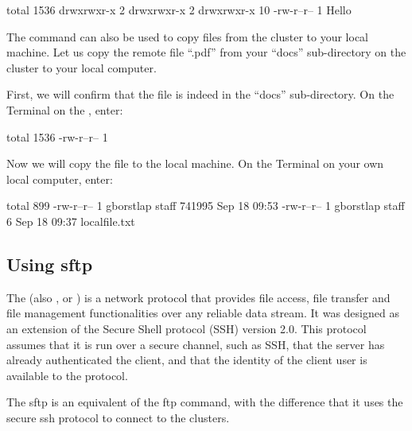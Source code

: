  \begin{prompt}
  total 1536
  drwxrwxr-x  2 %
  drwxrwxr-x  2 %
  drwxrwxr-x 10 %
  -rw-r--r--  1 %
  Hello
  \end{prompt}

  The  command can also be used to copy files from the cluster to your local machine.
  Let us copy the remote file ``\jobname.pdf'' from your ``docs''
  sub-directory on the cluster to your local computer.

  First, we will confirm that the file is indeed in the ``docs'' sub-directory.
  On the Terminal on the \hpc, enter:

  \begin{prompt}
  total 1536
  -rw-r--r-- 1 %
  \end{prompt}

  Now we will copy the file to the local machine. On the Terminal on your own local computer, enter:

  \begin{prompt}
  total  899
  -rw-r--r--   1 gborstlap  staff  741995 Sep 18 09:53 %
  -rw-r--r--   1 gborstlap  staff       6 Sep 18 09:37 localfile.txt
  \end{prompt}

  \subsection{Using sftp}

  The  (also , or ) is a network protocol that provides file access,
  file transfer and file management functionalities over any reliable data
  stream. It was designed as an extension of the Secure Shell protocol (SSH)
  version 2.0. This protocol assumes that it is run over a secure channel, such
  as SSH, that the server has already authenticated the client, and that the
  identity of the client user is available to the protocol.

  The sftp is an equivalent of the ftp command, with the difference that it uses
  the secure ssh protocol to connect to the clusters.

